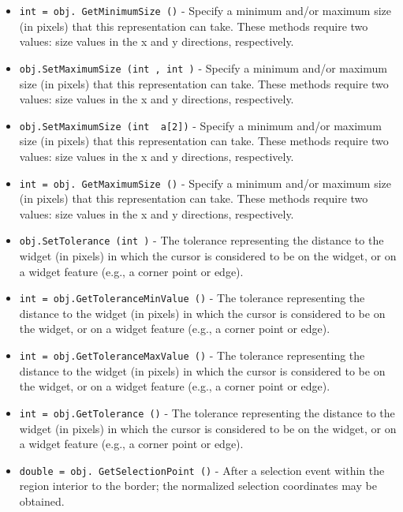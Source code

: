 \begin{itemize}
\item  \verb|int = obj. GetMinimumSize ()| -  Specify a minimum and/or maximum size (in pixels) that this representation
 can take. These methods require two values: size values in the x and y
 directions, respectively.

\item  \verb|obj.SetMaximumSize (int , int )| -  Specify a minimum and/or maximum size (in pixels) that this representation
 can take. These methods require two values: size values in the x and y
 directions, respectively.

\item  \verb|obj.SetMaximumSize (int  a[2])| -  Specify a minimum and/or maximum size (in pixels) that this representation
 can take. These methods require two values: size values in the x and y
 directions, respectively.

\item  \verb|int = obj. GetMaximumSize ()| -  Specify a minimum and/or maximum size (in pixels) that this representation
 can take. These methods require two values: size values in the x and y
 directions, respectively.

\item  \verb|obj.SetTolerance (int )| -  The tolerance representing the distance to the widget (in pixels)
 in which the cursor is considered to be on the widget, or on a
 widget feature (e.g., a corner point or edge).

\item  \verb|int = obj.GetToleranceMinValue ()| -  The tolerance representing the distance to the widget (in pixels)
 in which the cursor is considered to be on the widget, or on a
 widget feature (e.g., a corner point or edge).

\item  \verb|int = obj.GetToleranceMaxValue ()| -  The tolerance representing the distance to the widget (in pixels)
 in which the cursor is considered to be on the widget, or on a
 widget feature (e.g., a corner point or edge).

\item  \verb|int = obj.GetTolerance ()| -  The tolerance representing the distance to the widget (in pixels)
 in which the cursor is considered to be on the widget, or on a
 widget feature (e.g., a corner point or edge).

\item  \verb|double = obj. GetSelectionPoint ()| -  After a selection event within the region interior to the border; the
 normalized selection coordinates may be obtained.


\end{itemize}
